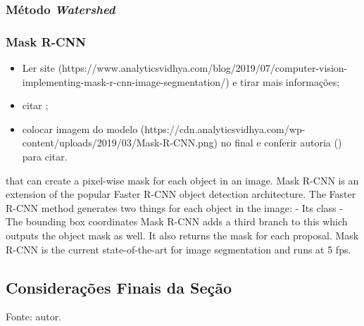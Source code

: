 \subsubsection{Método \textit{Watershed}}


\subsubsection{Mask R-CNN}
\begin{itemize}
    \item Ler site (https://www.analyticsvidhya.com/blog/2019/07/computer-vision-implementing-mask-r-cnn-image-segmentation/) e tirar mais informações;
    \item citar \cite{He2020};
    \item colocar imagem do modelo (https://cdn.analyticsvidhya.com/wp-content/uploads/2019/03/Mask-R-CNN.png) no final e conferir autoria (\cite{He2020}) para citar.
\end{itemize}
that can create a pixel-wise mask for each object in an image.
Mask R-CNN is an extension of the popular Faster R-CNN object detection architecture.
The Faster R-CNN method generates two things for each object in the image:
 - Its class
 - The bounding box coordinates
Mask R-CNN adds a third branch to this which outputs the object mask as well.
It also returns the mask for each proposal.
Mask R-CNN is the current state-of-the-art for image segmentation and runs at 5 fps.


\subsection{Considerações Finais da Seção}
\begin{table}[!h]
    \centering
    \caption{Comparação entre os métodos}
    \label{segment:table:1}
    
    \vspace*{1 cm}
    Fonte: autor.
\end{table}